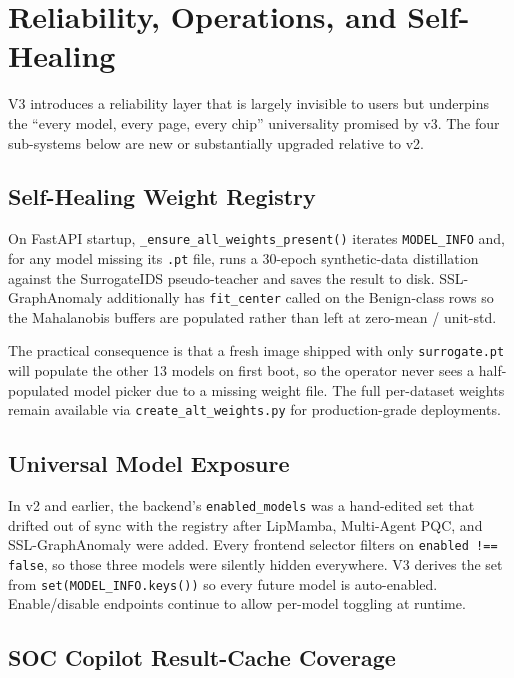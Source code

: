 \documentclass[11pt,a4paper]{article}
\begin{document}
\section{Reliability, Operations, and Self-Healing}
\label{sec:reliability}

V3 introduces a reliability layer that is largely invisible to users
but underpins the ``every model, every page, every chip''
universality promised by v3.  The four sub-systems below are new or
substantially upgraded relative to v2.

\subsection{Self-Healing Weight Registry}
\label{sec:reliability:weights}

On FastAPI startup, \texttt{\_ensure\_all\_weights\_present()} iterates
\texttt{MODEL\_INFO} and, for any model missing its \texttt{.pt}
file, runs a 30-epoch synthetic-data distillation against the
SurrogateIDS pseudo-teacher and saves the result to disk.
SSL-GraphAnomaly additionally has \texttt{fit\_center} called on the
Benign-class rows so the Mahalanobis buffers are populated rather
than left at zero-mean / unit-std.

The practical consequence is that a fresh image shipped with only
\texttt{surrogate.pt} will populate the other 13 models on first
boot, so the operator never sees a half-populated model picker due
to a missing weight file.  The full per-dataset weights remain
available via \texttt{create\_alt\_weights.py} for production-grade
deployments.

\subsection{Universal Model Exposure}
\label{sec:reliability:enabled}

In v2 and earlier, the backend's \texttt{enabled\_models} was a
hand-edited set that drifted out of sync with the registry after
LipMamba, Multi-Agent PQC, and SSL-GraphAnomaly were added.  Every
frontend selector filters on \texttt{enabled !== false}, so those
three models were silently hidden everywhere.  V3 derives the set
from \texttt{set(MODEL\_INFO.keys())} so every future model is
auto-enabled.  Enable/disable endpoints continue to allow per-model
toggling at runtime.

\subsection{SOC Copilot Result-Cache Coverage}
\label{sec:reliability:copilot}
\end{document}
